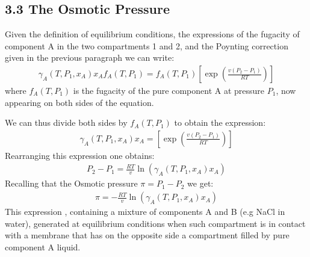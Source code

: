 \documentclass[letterpaper,10pt,english]{jupyterBook}
\begin{document}
\subsection{3.3 The Osmotic Pressure}
\label{\detokenize{Osmosis:id1}}
\sphinxAtStartPar
Given the definition of equilibrium conditions, the expressions of the fugacity of component A in the two compartments 1 and 2, and the Poynting correction given in the previous paragraph we can write:
\begin{equation}\label{equation:Osmosis:OSMeq}
\begin{split}
\gamma_A(T,P_1,x_A)x_A f_A(T,P_1)={f_A(T,P_1)}\left[\exp\left(\frac{v(P_2-P_1)}{RT}\right)\right]
\end{split}
\end{equation}
\sphinxAtStartPar
where \(f_A(T,P_1)\) is the fugacity of the pure component A at pressure \(P_1\), now appearing on both sides of the equation.

\sphinxAtStartPar
We can thus divide both sides by \(f_A(T,P_1)\) to obtain the expression:
\begin{equation}\label{equation:Osmosis:OSMeq4}
\begin{split}
\gamma_A(T,P_1,x_A)x_A =\left[\exp\left(\frac{v(P_2-P_1)}{RT}\right)\right]
\end{split}
\end{equation}
\sphinxAtStartPar
Rearranging this expression one obtains:
\begin{equation}\label{equation:Osmosis:OSMeq5}
\begin{split}
P_2-P_1=\frac{RT}{v}\ln\left({\gamma_A(T,P_1,x_A)x_A}\right)
\end{split}
\end{equation}
\sphinxAtStartPar
Recalling that the Osmotic pressure \(\pi=P_1-P_2\) we get:
\begin{equation}\label{equation:Osmosis:OSMeq6}
\begin{split}
\pi=-\frac{RT}{v}\ln\left({\gamma_A(T,P_1,x_A)x_A}\right)
\end{split}
\end{equation}
\sphinxAtStartPar
This expression , containing a mixture of components A and B (e.g NaCl in water),   generated at equilibrium conditions when such compartment is in contact with a  membrane that has on the opposite side a compartment filled by pure component A liquid.
\end{document}
